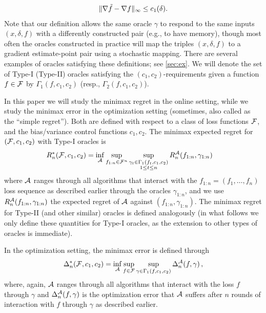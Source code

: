 \begin{align}
\label{eq:oracle2alt}
\|\nabla \tilde{f}- \nabla f\|_\infty \le c_1(\delta).
\end{align}
Note that our definition allows the same oracle $\gamma$ to respond to the same inputs $(x,\delta,f)$ with a differently constructed pair (e.g., to have memory), 
though most often the oracles constructed in practice 
will map the triples $(x,\delta,f)$ to a gradient estimate-point pair using a stochastic mapping.
There are several examples of oracles satisfying these definitions; see \cref{sec:ex}.
We will denote the set of Type-I (Type-II) oracles satisfying the $(c_1,c_2)$-requirements given a function $f\in \mathcal{F}$ by $\Gamma_1(f,c_1,c_2)$ (resp., $\Gamma_2(f,c_1,c_2)$). 

In this paper we will study the minimax regret in the online setting, while we study the minimax error in the optimization setting (sometimes, also called as the ``simple regret'').
Both are defined with respect to a class of loss functions $\mathcal{F}$, and the bias/variance control functions $c_1,c_2$.
The minimax expected regret for $(\mathcal{F},c_1,c_2)$ with Type-I oracles is
\begin{align}
\label{eq:minimaxregdef}
\MoveEqLeft
R_n^*(\cF,c_1,c_2) 
= \inf_{\cA} \sup_{f_{1:n}\in \cF^n} 
	\sup_{\substack{\gamma_t \in \Gamma_1(f_t,c_1,c_2)\\1\le t \le n}} R_n^{\cA}(f_{1:n},\gamma_{1:n})
\end{align}
where $\mathcal{A}$ ranges through all algorithms that interact with the $f_{1:n}= (f_1,\dots,f_n)$ loss sequence
as described earlier
through the oracles $\gamma_{1:n}$,
and we use $R_n^{\mathcal{A}}(f_{1:n},\gamma_{1:n})$ the expected regret of $\mathcal{A}$ against $(f_{1:n},\gamma_{1:n})$.
The minimax regret for Type-II (and other similar) oracles is defined analogously (in what follows we only define these quantities for Type-I oracles, as the extension to other types of oracles is immediate).

In the optimization setting, the minimax error is defined through
\begin{align}
\label{eq:minimaxerrdef}
\Delta_n^*(\mathcal{F},c_1,c_2)
= \inf_{\mathcal{A}} \sup_{f \in \mathcal{F}} \sup_{\gamma\in \Gamma_1(f,c_1,c_2)}  \Delta_n^{\mathcal{A}}(f,\gamma)\,,
\end{align}
where, again, $\mathcal{A}$ ranges through all algorithms that interact with the loss $f$ through $\gamma$ and 
$\Delta_n^{\mathcal{A}}(f,\gamma)$ is the optimization error that $\mathcal{A}$ suffers 
after $n$ rounds of interaction with $f$ through $\gamma$ as described earlier.

